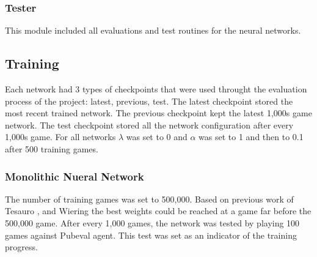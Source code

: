 \documentclass[12pt,a4paper]{article}
\begin{document}
\subsubsection{Tester}
This module included all evaluations and test routines for the neural networks. 

\subsection{Training}
Each network had 3 types of checkpoints that were used throught the evaluation process of the project: latest, previous, test. The latest checkpoint stored the most recent trained network. The previous checkpoint kept the latest 1,000s game network. The test checkpoint stored all the network configuration after every 1,000s game. For all networks $\lambda$ was set to 0 and $\alpha$ was set to 1 and then to 0.1 after 500 training games.

\subsubsection{Monolithic Nueral Network}
The number of training games was set to 500,000. Based on previous work of Tesauro \citeyear{DBLP:journals/ai/Tesauro02}, and Wiering \citeyear{DBLP:journals/jilsa/Wiering10} the best weights could be reached at a game far before the 500,000 game. After every 1,000 games, the network was tested by playing 100 games against Pubeval agent. This test was set as an indicator of the training progress.
\end{document}
